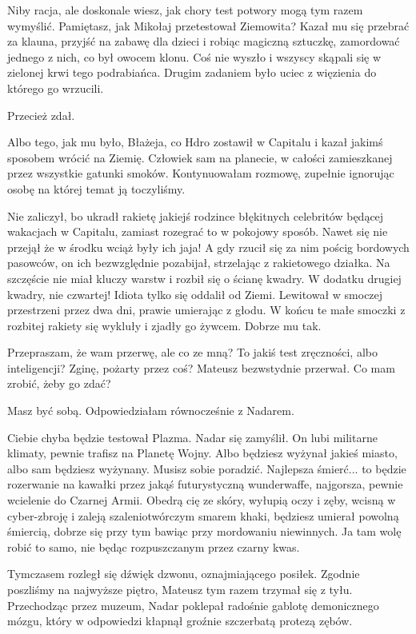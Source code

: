 \ds{} Niby racja, ale doskonale wiesz, jak chory test potwory mogą tym razem wymyślić.
Pamiętasz, jak Mikołaj przetestował Ziemowita? Kazał mu się przebrać za klauna, przyjść na zabawę dla dzieci i robiąc magiczną sztuczkę, zamordować jednego z nich, co był owocem klonu.
Coś nie wyszło i wszyscy skąpali się w zielonej krwi tego podrabiańca.
Drugim zadaniem było uciec z więzienia do którego go wrzucili. \de{}

\ds{} Przecież zdał. \de{}

\ds{} Albo tego, jak mu było, Błażeja, co Hdro zostawił w Capitalu i kazał jakimś sposobem wrócić na Ziemię.
Człowiek sam na planecie, w całości zamieszkanej przez wszystkie gatunki smoków. 
\dm{} Kontynuowałam rozmowę, zupełnie ignorując osobę na której temat ją toczyliśmy. \de{}

\ds{} Nie zaliczył, bo ukradł rakietę jakiejś rodzince błękitnych celebritów będącej wakacjach w Capitalu, zamiast rozegrać to w pokojowy sposób. Nawet się nie przejął że w środku wciąż były ich jaja!
A gdy rzucił się za nim pościg bordowych pasowców, on ich bezwzględnie pozabijał, strzelając z rakietowego działka.
Na szczęście nie miał kluczy warstw i rozbił się o ścianę kwadry. W dodatku drugiej kwadry, nie czwartej! Idiota tylko się oddalił od Ziemi.
Lewitował w smoczej przestrzeni przez dwa dni, prawie umierając z głodu. W końcu te małe smoczki z rozbitej rakiety się wykluły i zjadły go żywcem.
Dobrze mu tak. \de{}

\ds{} Przepraszam, że wam przerwę, ale co ze mną? To jakiś test zręczności, albo inteligencji? Zginę, pożarty przez coś? \dm{} Mateusz bezwstydnie przerwał. \dm{} Co mam zrobić, żeby go zdać? \de{}

\ds{} Masz być sobą. \dm{} Odpowiedziałam równocześnie z Nadarem. \de{}

\ds{} Ciebie chyba będzie testował Plazma. \dm{} Nadar się zamyślił. \dm{} On lubi militarne klimaty, pewnie trafisz na Planetę Wojny.
Albo będziesz wyżynał jakieś miasto, albo sam będziesz wyżynany. Musisz sobie poradzić. 
Najlepsza śmierć... to będzie rozerwanie na kawałki przez jakąś futurystyczną wunderwaffe, najgorsza, pewnie wcielenie do Czarnej Armii.
Obedrą cię ze skóry, wyłupią oczy i zęby, wcisną w cyber-zbroję i zaleją szaleniotwórczym smarem khaki, będziesz umierał powolną śmiercią, dobrze się przy tym bawiąc przy mordowaniu niewinnych. Ja tam wolę robić to samo, nie będąc rozpuszczanym przez czarny kwas.
\de{}

Tymczasem rozległ się dźwięk dzwonu, oznajmiającego posiłek.
Zgodnie poszliśmy na najwyższe piętro, Mateusz tym razem trzymał się z tyłu.
Przechodząc przez muzeum, Nadar poklepał radośnie gablotę demonicznego mózgu, który w odpowiedzi kłapnął groźnie szczerbatą protezą zębów.

